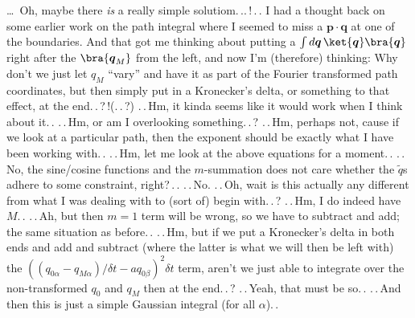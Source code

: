 \documentclass{report}
\begin{document}
\ldots\ Oh, maybe there \emph{is} a really simple solutiom.\,..\,!\,.\,. I had a thought back on some earlier work on the path integral where I seemed to miss a $\boldsymbol{p}\cdot \boldsymbol{q}$ at one of the boundaries. And that got me thinking about putting a $\int d\boldsymbol{q}\, \ket{\boldsymbol{q}}\bra{\boldsymbol{q}}$ right after the $\bra{\boldsymbol{q}_M}$ from the left, and now I'm (therefore) thinking: Why don't we just let $q_M$ ``vary'' and have it as part of the Fourier transformed path coordinates, but then simply put in a Kronecker's delta, or something to that effect, at the end.\,.\,?\,!(.\,.\,?) .\,.\,Hm, it kinda seems like it would work when I think about it.\,. .\,.\,Hm, or am I overlooking something.\,.\,? .\,.\,Hm, perhaps not, cause if we look at a particular path, then the exponent should be exactly what I have been working with.\,. .\,.\,Hm, let me look at the above equations for a moment.\,. .\,.\,No, the sine/cosine functions and the $m$-summation does not care whether the $\tilde q$s adhere to some constraint, right?\,.\,. .\,.\,No. .\,.\,Oh, wait is this actually any different from what I was dealing with to (sort of) begin with.\,.\,? .\,.\,Hm, I do indeed have $M$.\,. .\,.\,Ah, but then $m=1$ term will be wrong, so we have to subtract and add; the same situation as before.\,. .\,.\,Hm, but if we put a Kronecker's delta in both ends and add and subtract (where the latter is what we will then be left with) the $((q_{0\alpha} - q_{M\alpha})/ \delta t - a q_{0\beta})^2\delta t$ term, aren't we just able to integrate over the non-transformed $q_0$ and $q_M$ then at the end.\,.\,? .\,.\,Yeah, that must be so.\,. .\,.\,And then this is just a simple Gaussian integral (for all $\alpha$).\,. %
\end{document}
